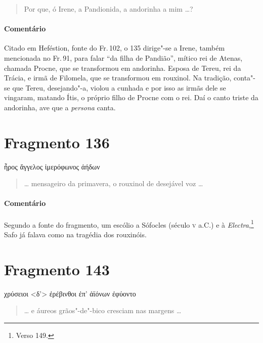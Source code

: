 \begin{verse}
Por que, ó Irene, a Pandionida, a andorinha a mim \ldots{}?
\end{verse}

\medskip

{\paragraph{Comentário} Citado em Heféstion, fonte do Fr.\,102, o 135 dirige"-se a Irene, também mencionada no Fr.\,91, para falar ``da filha de Pandião'', mítico rei de Atenas, chamada Procne, que se transformou em andorinha. Esposa de Tereu, rei da Trácia, e irmã de Filomela, que se transformou em rouxinol. Na tradição, conta"-se que Tereu, desejando"-a, violou a cunhada e por isso as irmãs dele se vingaram, matando Ítis, o próprio filho de Procne com o rei. Daí o canto triste da andorinha, ave que a \textit{persona} canta.}


\section{Fragmento 136}

\begin{gkverse}
ἦρος ἄγγελος ἰμερόφωνος ἀήδων
\end{gkverse}

\begin{verse}
\ldots{} mensageiro da primavera, o rouxinol de desejável voz \ldots{}
\end{verse}

\medskip

{\paragraph{Comentário} Segundo a fonte do fragmento, um escólio a Sófocles (século \textsc{v} a.C.) e à \textit{Electra},\footnote{Verso 149.} Safo já falava como na tragédia dos
rouxinóis.}

\section{Fragmento 143}

\begin{gkverse}
χρύσειοι <δ’> ἐρέβινθοι ἐπ’ ἀϊόνων ἐφύοντο
\end{gkverse}

\begin{verse}
\ldots{} e áureos grãos"-de"-bico cresciam nas margens \ldots{}
\end{verse}

